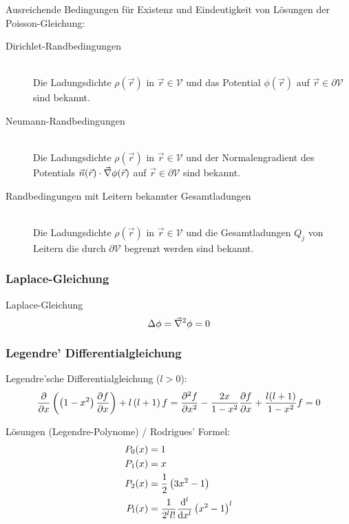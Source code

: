 			\noindent
			Ausreichende Bedingungen für Existenz und Eindeutigkeit von Lösungen der Poisson-Gleichung:
			\begin{description}
				\item[Dirichlet-Randbedingungen]\hfill \\
					Die Ladungsdichte $\rho(\vec{r})$ in $\vec{r}\in\mathcal{V}$ und das Potential $\phi(\vec{r})$ auf $\vec{r}\in\partial\mathcal{V}$ sind bekannt.
				\item[Neumann-Randbedingungen]\hfill \\
					Die Ladungsdichte $\rho(\vec{r})$ in $\vec{r}\in\mathcal{V}$ und der Normalengradient des Potentials $\vec{n}(\vec{r})\cdot\vec{\nabla}\phi(\vec{r})$ auf $\vec{r}\in\partial\mathcal{V}$ sind bekannt.
				\item[Randbedingungen mit Leitern bekannter Gesamtladungen]\hfill \\
					Die Ladungsdichte $\rho(\vec{r})$ in $\vec{r}\in\mathcal{V}$ und die Gesamtladungen $Q_j$ von Leitern die durch $\partial\mathcal{V}$ begrenzt werden sind bekannt.
			\end{description}

		\subsubsection{Laplace-Gleichung}
			\noindent
			Laplace-Gleichung
			\begin{equation}
				\Delta\phi=\vec{\nabla}^2\phi = 0
			\end{equation}

		\subsubsection{Legendre' Differentialgleichung}
			\noindent
			Legendre'sche Differentialgleichung ($l>0$):
			\begin{equation}
				\frac{\partial }{\partial x}\left(\left(1-x^2\right)\frac{\partial f}{\partial x}\right)+l\left(l+1\right)f
				= \frac{\partial^2 f}{\partial x^2} - \frac{2x}{1-x^2}\frac{\partial f}{\partial x} + \frac{l(l+1)}{1-x^2}f = 0
			\end{equation}

			\noindent
			Lösungen (Legendre-Polynome) / Rodrigues' Formel:
			\begin{equation} \label{Eq:LegendrePolynomials}
				\begin{aligned}
					P_0(x) &= 1 \\
					P_1(x) &= x \\
					P_2(x) &= \frac{1}{2}\left(3x^2-1\right) \\
					P_l(x) &= \frac{1}{2^l l!}\frac{\mathrm{d}^l}{\mathrm{d} x^l}\left(x^2-1\right)^l \\
				\end{aligned}
			\end{equation}

